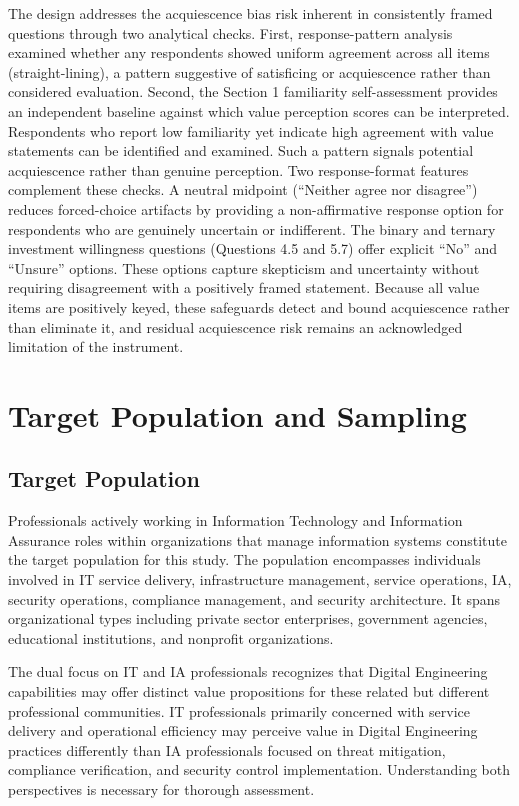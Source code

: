 The design addresses the acquiescence bias risk inherent in consistently framed questions through two analytical checks. First, response-pattern analysis examined whether any respondents showed uniform agreement across all items (straight-lining), a pattern suggestive of satisficing or acquiescence rather than considered evaluation. Second, the Section 1 familiarity self-assessment provides an independent baseline against which value perception scores can be interpreted. Respondents who report low familiarity yet indicate high agreement with value statements can be identified and examined. Such a pattern signals potential acquiescence rather than genuine perception. Two response-format features complement these checks. A neutral midpoint (``Neither agree nor disagree'') reduces forced-choice artifacts by providing a non-affirmative response option for respondents who are genuinely uncertain or indifferent. The binary and ternary investment willingness questions (Questions 4.5 and 5.7) offer explicit ``No'' and ``Unsure'' options. These options capture skepticism and uncertainty without requiring disagreement with a positively framed statement. Because all value items are positively keyed, these safeguards detect and bound acquiescence rather than eliminate it, and residual acquiescence risk remains an acknowledged limitation of the instrument.

\section{Target Population and Sampling}

\subsection{Target Population}

Professionals actively working in Information Technology and Information Assurance roles within organizations that manage information systems constitute the target population for this study. The population encompasses individuals involved in IT service delivery, infrastructure management, service operations, IA, security operations, compliance management, and security architecture. It spans organizational types including private sector enterprises, government agencies, educational institutions, and nonprofit organizations.

The dual focus on IT and IA professionals recognizes that Digital Engineering capabilities may offer distinct value propositions for these related but different professional communities. IT professionals primarily concerned with service delivery and operational efficiency may perceive value in Digital Engineering practices differently than IA professionals focused on threat mitigation, compliance verification, and security control implementation. Understanding both perspectives is necessary for thorough assessment.

